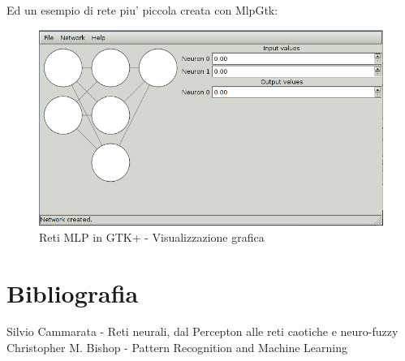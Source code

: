 \documentclass[a4paper,10pt]{report}
\begin{document}
Ed un esempio di rete piu' piccola creata con MlpGtk:

\begin{figure}[!ht]
	\begin{center}	
		\includegraphics[scale=0.65]{img/screen/mlp_gtk.png}
		\caption{Reti MLP in GTK+ - Visualizzazione grafica}
		\label{fig: Reti MLP in GTK+ - Visualizzazione}
	\end{center}
\end{figure}

\chapter{Bibliografia}
\begin{thebibliography}{Bibliografia}
	 Silvio Cammarata - Reti neurali, dal Percepton alle reti caotiche e neuro-fuzzy
	 Christopher M. Bishop - Pattern Recognition and Machine Learning
\end{thebibliography}

\appendix
\end{document}
